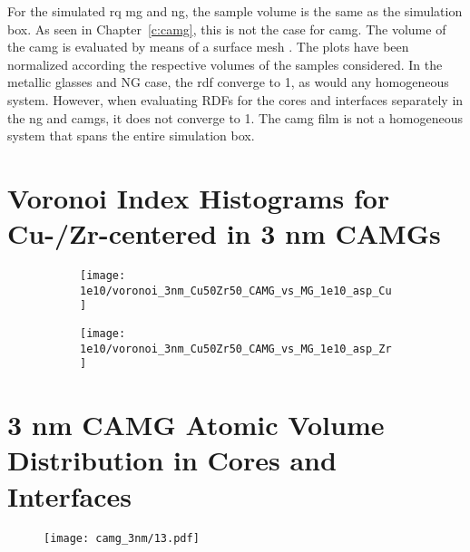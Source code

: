 For the simulated \gls{rq} \gls{mg} and \gls{ng}, the sample volume is the same as the simulation box. As seen in Chapter~\ref{c:camg}, this is not the case for \gls{camg}. The volume of the \gls{camg} is evaluated by means of a surface mesh \cite{Stukowski2014}. The plots have been normalized according the respective volumes of the samples considered. In the metallic glasses and NG case, the \gls{rdf} converge to 1, as would any homogeneous system. However, when evaluating RDFs for the cores and interfaces separately in the \gls{ng} and \gls{camg}s, it does not converge to 1. The \gls{camg} film is not a homogeneous system that spans the entire simulation box. 

\section{Voronoi Index Histograms for Cu-/Zr-centered in 3 nm CAMGs}
\begin{figure}[!h]
	\centering
	\begin{subfigure}{0.47\linewidth} \centering \texttt{[image: 1e10/voronoi\_3nm\_Cu50Zr50\_CAMG\_vs\_MG\_1e10\_asp\_Cu]} 
		\subcaption{} \end{subfigure}%
	\hfill
	\begin{subfigure}{0.47\linewidth} \centering \texttt{[image: 1e10/voronoi\_3nm\_Cu50Zr50\_CAMG\_vs\_MG\_1e10\_asp\_Zr]}
		\subcaption{} \end{subfigure}
	\label{f:voro_cu-zr}
\end{figure}

\clearpage
\section{3 nm CAMG Atomic Volume Distribution in Cores and Interfaces}
\begin{figure}[!h]
	\centering
	\texttt{[image: camg\_3nm/13.pdf]}
	\label{f:atvol}
\end{figure}

